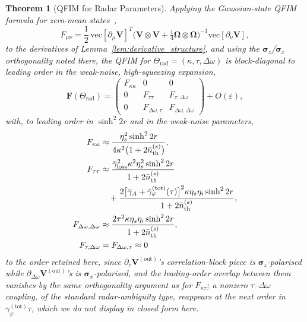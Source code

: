 \documentclass[journal]{IEEEtran}
\newtheorem{theorem}{Theorem}
\begin{document}
\begin{theorem}[QFIM for Radar Parameters]\label{thm:qfim_radar}
Applying the Gaussian-state QFIM formula for zero-mean states~\cite{safranek2019estimation,monras2013phase},
\begin{equation}\label{eq:gaussian_qfim_exact}
F_{\mu\nu} = \frac12\,\mathrm{vec}[\partial_\mu\mathbf V]^{T}\big(\mathbf V\otimes\mathbf V+\tfrac14\boldsymbol\Omega\otimes\boldsymbol\Omega\big)^{-1}\mathrm{vec}[\partial_\nu\mathbf V],
\end{equation}
to the derivatives of Lemma~\ref{lem:derivative_structure}, and using the $\boldsymbol\sigma_z$/$\boldsymbol\sigma_x$ orthogonality noted there, the QFIM for $\Theta_{\text{rad}}=(\kappa,\tau,\Delta\omega)$ is block-diagonal to leading order in the weak-noise, high-squeezing expansion,
\begin{equation}\label{eq:qfim_radar}
\mathbf{F}(\Theta_{\text{rad}}) = \begin{pmatrix}
F_{\kappa\kappa} & 0 & 0 \\
0 & F_{\tau\tau} & F_{\tau,\Delta\omega} \\
0 & F_{\Delta\omega,\tau} & F_{\Delta\omega,\Delta\omega}
\end{pmatrix} + O(\varepsilon),
\end{equation}
with, to leading order in $\sinh^2 2r$ and in the weak-noise parameters,
\begin{align}
F_{\kappa\kappa} &\approx \frac{\eta_s^2\sinh^2 2r}{4\kappa^2\big(1+2\bar n_{\text{th}}^{(s)}\big)}, \label{eq:f_kappa}\\
F_{\tau\tau} &\approx \frac{\bar\gamma_{\text{loss}}^2\kappa^2\eta_s^2\sinh^2 2r}{1+2\bar n_{\text{th}}^{(s)}} \notag\\
&\quad+\frac{2\big[\bar\gamma_A+\tilde\gamma_\varphi^{(\text{tot})}(\tau)\big]^2\kappa\eta_s\eta_i\sinh^2 2r}{1+2\bar n_{\text{th}}^{(s)}}, \label{eq:f_tau}\\
F_{\Delta\omega,\Delta\omega} &\approx \frac{2\tau^2\kappa\eta_s\eta_i\sinh^2 2r}{1+2\bar n_{\text{th}}^{(s)}}, \label{eq:f_doppler}\\
F_{\tau,\Delta\omega}&=F_{\Delta\omega,\tau}\approx0 \label{eq:f_cross}
\end{align}
to the order retained here, since $\partial_\tau\mathbf V^{(\text{out})}$'s correlation-block piece is $\boldsymbol\sigma_z$-polarised while $\partial_{\Delta\omega}\mathbf V^{(\text{out})}$'s is $\boldsymbol\sigma_x$-polarised, and the leading-order overlap between them vanishes by the same orthogonality argument as for $F_{\kappa\tau}$; a nonzero $\tau$--$\Delta\omega$ coupling, of the standard radar-ambiguity type, reappears at the next order in $\gamma_\varphi^{(\text{tot})}\tau$, which we do not display in closed form here.
\end{theorem}
\end{document}
